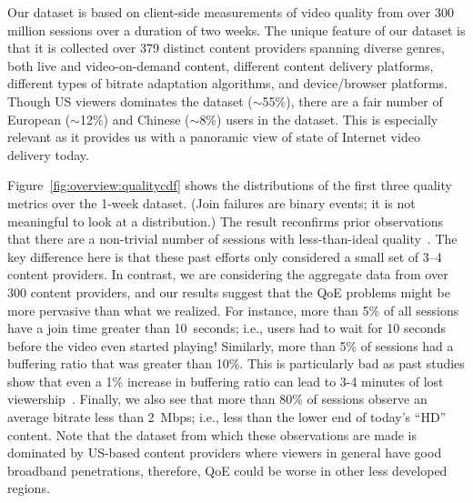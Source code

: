 Our dataset is based on client-side measurements of
video  quality from over 300 million sessions over a duration
of two weeks. The unique feature of our dataset is that it is 
collected over 379 distinct content providers spanning diverse 
genres, both live and video-on-demand content, different 
content delivery platforms, different types of  bitrate adaptation 
algorithms, and device/browser platforms. 
Though US viewers dominates the dataset ($\sim$55\%), 
there are a fair number of European ($\sim$12\%) and 
Chinese ($\sim$8\%) users in the dataset.
This is especially relevant as it provides us with a panoramic 
view   of state of  Internet video delivery today.

Figure~\ref{fig:overview:qualitycdf} shows the distributions of the 
first three quality metrics over the 1-week dataset.  
(Join failures are binary events; it is not meaningful to look at a 
distribution.) 
The result reconfirms prior observations that there are a non-trivial 
number of sessions with less-than-ideal 
quality~\cite{sigcomm11,sigcomm12}. 
The key difference here is that  these past efforts only considered 
a small set of 3--4 content providers. 
In contrast,   we are considering the aggregate data from over 
300 content providers, and our results suggest that the QoE 
problems might be more pervasive than what we realized.
For instance, more than 5\% of all sessions have a join time greater 
than 10~seconds; i.e., users had to wait for 10 seconds before the 
video even started playing! Similarly, more than 5\% of sessions 
had a buffering ratio that was greater than 10\%.  
This is particularly bad as past studies show that even a 1\% 
increase in buffering ratio can lead to 3-4 minutes of lost 
viewership~\cite{sigcomm11}.  
Finally, we also see that more than 80\% of sessions observe 
an average  bitrate less than 2~Mbps; 
i.e., less than the lower end of today's ``HD'' content.   
Note that the dataset from which these observations are made
is dominated by  US-based content providers where viewers in general
have good broadband penetrations, therefore, QoE could be worse in 
other less developed regions.


